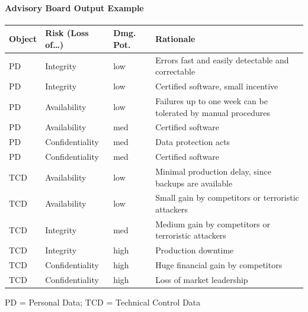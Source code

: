 \documentclass[a4paper]{article}
\begin{document}
\begin{multicols}{3}
    \paragraph{Advisory Board Output Example}
    \begin{tabular}{ p{.6cm} | l | p{.45cm} | p{4.3cm} }
        Object & Risk (Loss of\dots ) & Dmg. Pot. & Rationale                                                     \\\hline
        PD     & Integrity            & low       & Errors fast and easily detectable and correctable             \\
        PD     & Integrity            & low       & Certified software, small incentive                           \\
        PD     & Availability         & low       & Failures up to one week can be tolerated by manual procedures \\
        PD     & Availability         & med       & Certified software                                            \\
        PD     & Confidentiality      & med       & Data protection acts                                          \\
        PD     & Confidentiality      & med       & Certified software                                            \\
        TCD    & Availability         & low       & Minimal production delay, since backups are available         \\
        TCD    & Availability         & low       & Small gain by competitors or terroristic attackers            \\
        TCD    & Integrity            & med       & Medium gain by competitors or terroristic attackers           \\
        TCD    & Integrity            & high      & Production downtime                                           \\
        TCD    & Confidentiality      & high      & Huge financial gain by competitors                            \\
        TCD    & Confidentiality      & high      & Loss of market leadership                                     \\
    \end{tabular}
    PD = Personal Data; TCD = Technical Control Data


\end{multicols}
\end{document}
